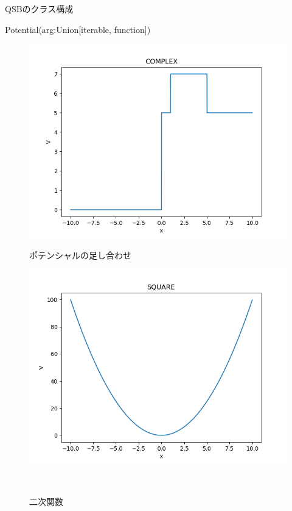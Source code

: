 \documentclass[a4paper, lualatex]{bxjsarticle}
\begin{document}
\begin{section}{QSBのクラス構成}
\begin{subsection}{Potential(arg:Union[iterable, function])}
\begin{figure}[h]
\begin{minipage}{0.5\hsize}
                \includegraphics[width=0.9\hsize]{COMPLEX.png}
                \caption{ポテンシャルの足し合わせ}
            \end{minipage}
            \begin{minipage}{0.5\hsize}
                \centering
                \includegraphics[width=0.9\hsize]{SQUARE.png}
                \caption{二次関数}
            \end{minipage}\\
            \begin{minipage}{0.5\hsize}
                \centering

\end{minipage}
\end{figure}
\end{subsection}
\end{section}
\end{document}
